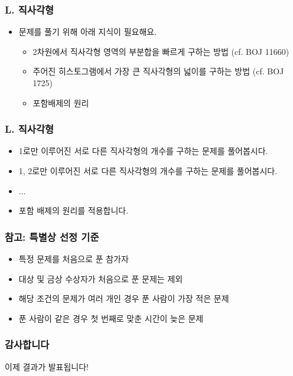 \documentclass[xetex]{beamer}
\begin{document}
\begin{frame}
  \frametitle{L. 직사각형}
  \begin{itemize}
    \item 문제를 풀기 위해 아래 지식이 필요해요.
    \begin{itemize}
      \item 2차원에서 직사각형 영역의 부분합을 빠르게 구하는 방법 (cf. BOJ 11660)
      \item 주어진 히스토그램에서 가장 큰 직사각형의 넓이를 구하는 방법 (cf. BOJ 1725)
      \item 포함배제의 원리
    \end{itemize}
  \end{itemize}
\end{frame}

\begin{frame}
  \frametitle{L. 직사각형}
  \begin{itemize}
    \item 1로만 이루어진 서로 다른 직사각형의 개수를 구하는 문제를 풀어봅시다.
    \item 1, 2로만 이루어진 서로 다른 직사각형의 개수를 구하는 문제를 풀어봅시다.
    \item ...
    \item 포함 배제의 원리를 적용합니다.
  \end{itemize}
\end{frame}

\begin{frame}
  \frametitle{참고: 특별상 선정 기준}
  \begin{itemize}
    \item 특정 문제를 처음으로 푼 참가자
    \item 대상 및 금상 수상자가 처음으로 푼 문제는 제외
    \item 해당 조건의 문제가 여러 개인 경우 푼 사람이 가장 적은 문제
    \item 푼 사람이 같은 경우 첫 번째로 맞춘 시간이 늦은 문제
  \end{itemize}
\end{frame}

\begin{frame}
  \frametitle{감사합니다}
  \begin{center}
    이제 결과가 발표됩니다!
  \end{center}
\end{frame}
\end{document}
